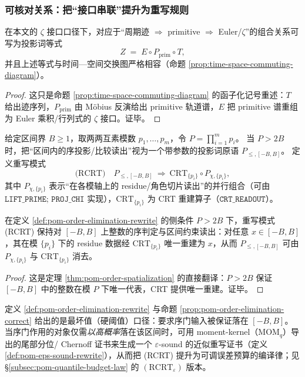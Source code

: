 \subsubsection{可核对关系：把“接口串联”提升为重写规则}
\begin{proposition}\label{prop:pom-zeta-factorization-rewrite}
在本文的 \(\zeta\) 接口口径下，对应于“周期迹 \(\Rightarrow\) primitive \(\Rightarrow\) Euler/\(\zeta\)”的组合关系可写为投影词等式
$$
Z \;=\; E\circ P_{\mathrm{prim}}\circ T,
$$
并且上述等式与时间—空间交换图严格相容（命题 \ref{prop:time-space-commuting-diagram}）。
\end{proposition}
\begin{proof}
这只是命题 \ref{prop:time-space-commuting-diagram} 的函子化记号重述：\(T\) 给出迹序列，\(P_{\mathrm{prim}}\) 由 Möbius 反演给出 primitive 轨道谱，\(E\) 把 primitive 谱重组为 Euler 乘积/行列式的 \(\zeta\) 接口。证毕。
\end{proof}

\begin{definition}\label{def:pom-order-elimination-rewrite}
给定区间界 \(B\ge 1\)，取两两互素模数 \(p_1,\dots,p_m\)，令 \(P=\prod_{i=1}^m p_i\)。
当 \(P>2B\) 时，把“区间内的序投影/比较读出”视为一个带参数的投影词原语 \(P_{\le,[-B,B]}\)。
定义重写模式
$$
\text{(RCRT)}\quad
P_{\le,[-B,B]}
\ \Longrightarrow\
\mathrm{CRT}_{\{p_i\}}\circ P_{\chi,\{p_i\}},
$$
其中 \(P_{\chi,\{p_i\}}\) 表示“在各模轴上的 residue/角色切片读出”的并行组合（可由 \(\texttt{LIFT\_PRIME; PROJ\_CHI}\) 实现），\(\mathrm{CRT}_{\{p_i\}}\) 为 CRT 重建算子（\(\texttt{CRT\_READOUT}\)）。
\end{definition}

\begin{proposition}\label{prop:pom-order-elimination-correct}
在定义 \ref{def:pom-order-elimination-rewrite} 的侧条件 \(P>2B\) 下，重写模式 (RCRT) 保持对 \([-B,B]\) 上整数的序判定与区间约束读出：对任意 \(x\in[-B,B]\)，其在模 \(\{p_i\}\) 下的 residue 数据经 \(\mathrm{CRT}_{\{p_i\}}\) 唯一重建为 \(x\)，从而 \(P_{\le,[-B,B]}\) 可由 \(P_{\chi,\{p_i\}}\) 与 \(\mathrm{CRT}_{\{p_i\}}\) 消去。
\end{proposition}
\begin{proof}
这是定理 \ref{thm:pom-order-spatialization} 的直接翻译：\(P>2B\) 保证 \([-B,B]\) 中的整数在模 \(P\) 下唯一代表，CRT 提供唯一重建。证毕。
\end{proof}

\begin{remark}\label{rem:pom-rcrt-epsilon-pointer}
定义 \ref{def:pom-order-elimination-rewrite} 与命题 \ref{prop:pom-order-elimination-correct} 给出的是最坏值（硬阈值）口径：要求序门输入被保证落在 \([-B,B]\)。
当序门作用的对象仅需\emph{以高概率}落在该区间时，可用 moment-kernel（\(\mathrm{MOM}_q\)）导出的尾部分位/ Chernoff 证书来生成一个 \(\varepsilon\)-sound 的近似重写证书（定义 \ref{def:pom-eps-sound-rewrite}），从而把 (RCRT) 提升为可调误差预算的编译律；见 \S\ref{subsec:pom-quantile-budget-law} 的 \((\mathrm{RCRT}_\varepsilon)\) 版本。
\end{remark}

